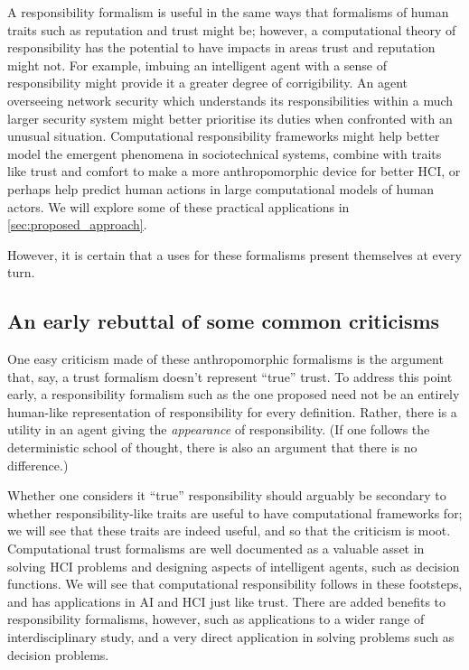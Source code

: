 A responsibility formalism is useful in the same ways that formalisms of human traits such as reputation and trust might be; however, a computational theory of responsibility has the potential to have impacts in areas trust and reputation might not. For example, imbuing an intelligent agent with a sense of responsibility might provide it a greater degree of corrigibility\cite{corrigibility}. An agent overseeing network security which understands its responsibilities within a much larger security system might better prioritise its duties when confronted with an unusual situation. Computational responsibility frameworks might help better model the emergent phenomena in sociotechnical systems, combine with traits like trust and comfort to make a more anthropomorphic device for better HCI, or perhaps help predict human actions in large computational models of human actors. We will explore some of these practical applications in \cref{sec:proposed_approach}.\par

However, it is certain that a uses for these formalisms present themselves at every turn.\par

\subsection{An early rebuttal of some common criticisms}
One easy criticism made of these anthropomorphic formalisms is the argument that, say, a trust formalism doesn't represent ``true'' trust. To address this point early, a responsibility formalism such as the one proposed need not be an entirely human-like representation of responsibility for every definition. Rather, there is a utility in an agent giving the \emph{appearance} of responsibility. (If one follows the deterministic school of thought, there is also an argument that there is no difference\cite{determinism_in_brief}.) \par

Whether one considers it ``true'' responsibility should arguably be secondary to whether responsibility-like traits are useful to have computational frameworks for; we will see that these traits are indeed useful, and so that the criticism is moot. Computational trust formalisms are well documented as a valuable asset in solving HCI problems and designing aspects of intelligent agents, such as decision functions. We will see that computational responsibility follows in these footsteps, and has applications in AI and HCI just like trust. There are added benefits to responsibility formalisms, however, such as applications to a wider range of interdisciplinary study, and a very direct application in solving problems such as decision problems.\par


